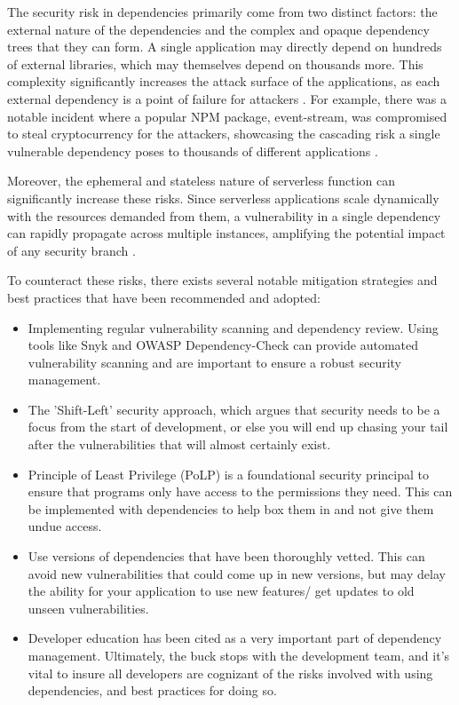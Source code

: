 \documentclass[sigconf]{acmart}
\begin{document}
The security risk in dependencies primarily come from two distinct factors: the external nature of the dependencies and the complex and opaque dependency trees that they can form. A single application may directly depend on hundreds of external libraries, which may themselves depend on thousands more. This complexity significantly increases the attack surface of the applications, as each external dependency is a point of failure for attackers \cite{OWASP2021top}. For example, there was a notable incident where a popular NPM package, event-stream, was compromised to steal cryptocurrency for the attackers, showcasing the cascading risk a single vulnerable dependency poses to thousands of different applications \cite{fox2018open}.

Moreover, the ephemeral and stateless nature of serverless function can significantly increase these risks. Since serverless applications scale dynamically with the resources demanded from them, a vulnerability in a single dependency can rapidly propagate across multiple instances, amplifying the potential impact of any security branch \cite{kavis2014cloud}.

To counteract these risks, there exists several notable mitigation strategies and best practices that have been recommended and adopted:
\begin{itemize}
	\item Implementing regular vulnerability scanning and dependency review. Using tools like Snyk and OWASP Dependency-Check can provide automated vulnerability scanning and are important to ensure a robust security management.
	\item The 'Shift-Left' security approach, which argues that security needs to be a focus from the start of development, or else you will end up chasing your tail after the vulnerabilities that will almost certainly exist.
	\item Principle of Least Privilege (PoLP) is a foundational security principal to ensure that programs only have access to the permissions they need. This can be implemented with dependencies to help box them in and not give them undue access.
	\item Use versions of dependencies that have been thoroughly vetted. This can avoid new vulnerabilities that could come up in new versions, but may delay the ability for your application to use new features/ get updates to old unseen vulnerabilities.
	\item Developer education has been cited as a very important part of dependency management. Ultimately, the buck stops with the development team, and it's vital to insure all developers are cognizant of the risks involved with using dependencies, and best practices for doing so.
\end{itemize}
\end{document}
